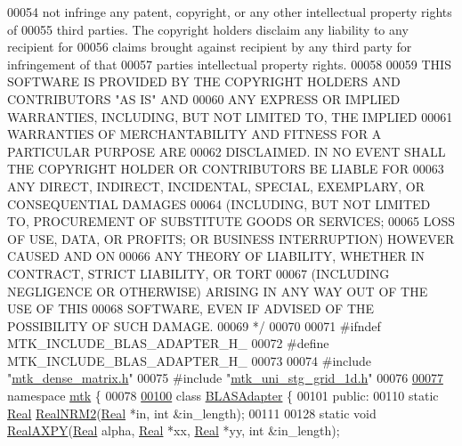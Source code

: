 \begin{DoxyCode}
00054 \textcolor{comment}{not infringe any patent, copyright, or any other intellectual property rights of}
00055 \textcolor{comment}{third parties. The copyright holders disclaim any liability to any recipient for}
00056 \textcolor{comment}{claims brought against recipient by any third party for infringement of that}
00057 \textcolor{comment}{parties intellectual property rights.}
00058 \textcolor{comment}{}
00059 \textcolor{comment}{THIS SOFTWARE IS PROVIDED BY THE COPYRIGHT HOLDERS AND CONTRIBUTORS "AS IS" AND}
00060 \textcolor{comment}{ANY EXPRESS OR IMPLIED WARRANTIES, INCLUDING, BUT NOT LIMITED TO, THE IMPLIED}
00061 \textcolor{comment}{WARRANTIES OF MERCHANTABILITY AND FITNESS FOR A PARTICULAR PURPOSE ARE}
00062 \textcolor{comment}{DISCLAIMED. IN NO EVENT SHALL THE COPYRIGHT HOLDER OR CONTRIBUTORS BE LIABLE FOR}
00063 \textcolor{comment}{ANY DIRECT, INDIRECT, INCIDENTAL, SPECIAL, EXEMPLARY, OR CONSEQUENTIAL DAMAGES}
00064 \textcolor{comment}{(INCLUDING, BUT NOT LIMITED TO, PROCUREMENT OF SUBSTITUTE GOODS OR SERVICES;}
00065 \textcolor{comment}{LOSS OF USE, DATA, OR PROFITS; OR BUSINESS INTERRUPTION) HOWEVER CAUSED AND ON}
00066 \textcolor{comment}{ANY THEORY OF LIABILITY, WHETHER IN CONTRACT, STRICT LIABILITY, OR TORT}
00067 \textcolor{comment}{(INCLUDING NEGLIGENCE OR OTHERWISE) ARISING IN ANY WAY OUT OF THE USE OF THIS}
00068 \textcolor{comment}{SOFTWARE, EVEN IF ADVISED OF THE POSSIBILITY OF SUCH DAMAGE.}
00069 \textcolor{comment}{*/}
00070 
00071 \textcolor{preprocessor}{#ifndef MTK\_INCLUDE\_BLAS\_ADAPTER\_H\_}
00072 \textcolor{preprocessor}{#define MTK\_INCLUDE\_BLAS\_ADAPTER\_H\_}
00073 
00074 \textcolor{preprocessor}{#include "\hyperlink{mtk__dense__matrix_8h}{mtk\_dense\_matrix.h}"}
00075 \textcolor{preprocessor}{#include "\hyperlink{mtk__uni__stg__grid__1d_8h}{mtk\_uni\_stg\_grid\_1d.h}"}
00076 
\hypertarget{mtk__blas__adapter_8h_source_l00077}{}\hyperlink{namespacemtk}{00077} \textcolor{keyword}{namespace }\hyperlink{namespacemtk}{mtk} \{
00078 
\hypertarget{mtk__blas__adapter_8h_source_l00100}{}\hyperlink{classmtk_1_1BLASAdapter}{00100} \textcolor{keyword}{class }\hyperlink{classmtk_1_1BLASAdapter}{BLASAdapter} \{
00101  \textcolor{keyword}{public}:
00110   \textcolor{keyword}{static} \hyperlink{group__c01-roots_gac080bbbf5cbb5502c9f00405f894857d}{Real} \hyperlink{classmtk_1_1BLASAdapter_ab92440888b730863244c5d9479c11aca}{RealNRM2}(\hyperlink{group__c01-roots_gac080bbbf5cbb5502c9f00405f894857d}{Real} *in, \textcolor{keywordtype}{int} &in\_length);
00111 
00128   \textcolor{keyword}{static} \textcolor{keywordtype}{void} \hyperlink{classmtk_1_1BLASAdapter_a081cd092ae65e730f44eae8643edd539}{RealAXPY}(\hyperlink{group__c01-roots_gac080bbbf5cbb5502c9f00405f894857d}{Real} alpha, \hyperlink{group__c01-roots_gac080bbbf5cbb5502c9f00405f894857d}{Real} *xx, \hyperlink{group__c01-roots_gac080bbbf5cbb5502c9f00405f894857d}{Real} *yy, \textcolor{keywordtype}{int} &in\_length);

\end{DoxyCode}

